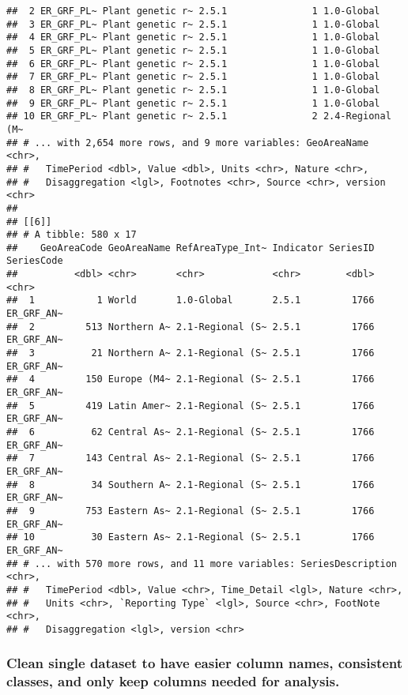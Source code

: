 \documentclass[]{article}
\begin{document}
\begin{verbatim}
##  2 ER_GRF_PL~ Plant genetic r~ 2.5.1               1 1.0-Global      
##  3 ER_GRF_PL~ Plant genetic r~ 2.5.1               1 1.0-Global      
##  4 ER_GRF_PL~ Plant genetic r~ 2.5.1               1 1.0-Global      
##  5 ER_GRF_PL~ Plant genetic r~ 2.5.1               1 1.0-Global      
##  6 ER_GRF_PL~ Plant genetic r~ 2.5.1               1 1.0-Global      
##  7 ER_GRF_PL~ Plant genetic r~ 2.5.1               1 1.0-Global      
##  8 ER_GRF_PL~ Plant genetic r~ 2.5.1               1 1.0-Global      
##  9 ER_GRF_PL~ Plant genetic r~ 2.5.1               1 1.0-Global      
## 10 ER_GRF_PL~ Plant genetic r~ 2.5.1               2 2.4-Regional (M~
## # ... with 2,654 more rows, and 9 more variables: GeoAreaName <chr>,
## #   TimePeriod <dbl>, Value <dbl>, Units <chr>, Nature <chr>,
## #   Disaggregation <lgl>, Footnotes <chr>, Source <chr>, version <chr>
## 
## [[6]]
## # A tibble: 580 x 17
##    GeoAreaCode GeoAreaName RefAreaType_Int~ Indicator SeriesID SeriesCode
##          <dbl> <chr>       <chr>            <chr>        <dbl> <chr>     
##  1           1 World       1.0-Global       2.5.1         1766 ER_GRF_AN~
##  2         513 Northern A~ 2.1-Regional (S~ 2.5.1         1766 ER_GRF_AN~
##  3          21 Northern A~ 2.1-Regional (S~ 2.5.1         1766 ER_GRF_AN~
##  4         150 Europe (M4~ 2.1-Regional (S~ 2.5.1         1766 ER_GRF_AN~
##  5         419 Latin Amer~ 2.1-Regional (S~ 2.5.1         1766 ER_GRF_AN~
##  6          62 Central As~ 2.1-Regional (S~ 2.5.1         1766 ER_GRF_AN~
##  7         143 Central As~ 2.1-Regional (S~ 2.5.1         1766 ER_GRF_AN~
##  8          34 Southern A~ 2.1-Regional (S~ 2.5.1         1766 ER_GRF_AN~
##  9         753 Eastern As~ 2.1-Regional (S~ 2.5.1         1766 ER_GRF_AN~
## 10          30 Eastern As~ 2.1-Regional (S~ 2.5.1         1766 ER_GRF_AN~
## # ... with 570 more rows, and 11 more variables: SeriesDescription <chr>,
## #   TimePeriod <dbl>, Value <chr>, Time_Detail <lgl>, Nature <chr>,
## #   Units <chr>, `Reporting Type` <lgl>, Source <chr>, FootNote <chr>,
## #   Disaggregation <lgl>, version <chr>
\end{verbatim}

\subsubsection{Clean single dataset to have easier column names,
consistent classes, and only keep columns needed for
analysis.}\label{clean-single-dataset-to-have-easier-column-names-consistent-classes-and-only-keep-columns-needed-for-analysis.}
\end{document}
